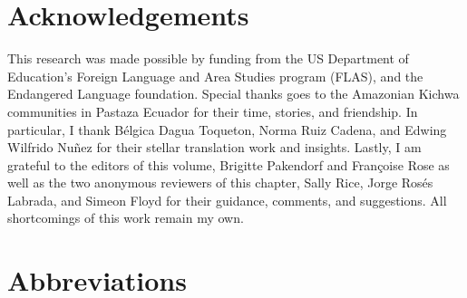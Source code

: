 \documentclass[output=paper]{langscibook}
\begin{document}
\section*{Acknowledgements}

This research was made possible by funding from the US Department of Education’s Foreign Language and Area Studies program (FLAS), and the Endangered Language foundation. Special thanks goes to the Amazonian Kichwa communities in Pastaza Ecuador for their time, stories, and friendship. In particular, I thank Bélgica Dagua Toqueton, Norma Ruiz Cadena, and Edwing Wilfrido Nuñez for their stellar translation work and insights. Lastly, I am grateful to the editors of this volume, Brigitte Pakendorf and Françoise Rose as well as the two anonymous reviewers of this chapter, Sally Rice, Jorge Rosés Labrada, and Simeon Floyd for their guidance, comments, and suggestions. All shortcomings of this work remain my own.


\section*{Abbreviations}
\end{document}
